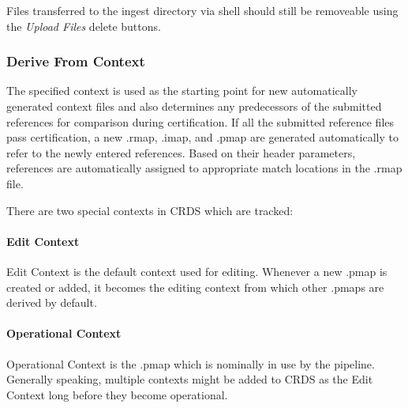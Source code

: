 \documentclass[letterpaper,10pt,english]{sphinxmanual}
\begin{document}
Files transferred to the ingest directory via shell should
still be removeable using the \emph{Upload Files} delete buttons.


\subsubsection{Derive From Context}
\label{web_site_use:derive-from-context}
The specified context is used as the starting point for new automatically
generated context files and also determines any predecessors of the submitted
references for comparison during certification.   If all the submitted reference
files pass certification,  a new .rmap, .imap, and .pmap are generated
automatically to refer to the newly entered references.    Based on their
header parameters,  references are automatically assigned to appropriate
match locations in the .rmap file.
\begin{figure}[htbp]
\centering

\end{figure}

There are two special contexts in CRDS which are tracked:


\paragraph{Edit Context}
\label{web_site_use:edit-context}
Edit Context is the default context used for editing.   Whenever a new .pmap is created or
added,  it becomes the editing context from which other .pmaps are derived by
default.


\paragraph{Operational Context}
\label{web_site_use:operational-context}
Operational Context is the .pmap which is nominally in use by
the pipeline.  Generally speaking,  multiple contexts might be added to CRDS as
the Edit Context long before they become operational.
\end{document}
